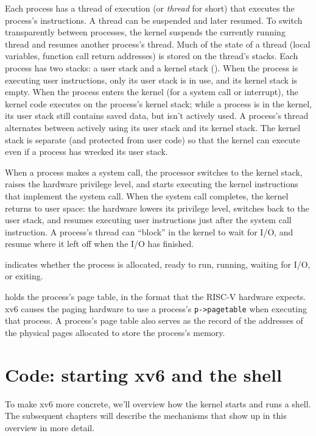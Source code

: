 Each process has a thread of execution (or 
\textit{thread}
for short) that executes the process's instructions.
A thread can be suspended and later resumed.
To switch transparently between processes,
the kernel suspends the currently running thread and resumes another process's
thread.  Much of the state of a thread (local variables, function call return
addresses) is stored on the thread's stacks.
Each process has two stacks: a user stack and a kernel stack
().
When the process is executing user instructions, only its user stack
is in use, and its kernel stack is empty.
When the process enters the kernel (for a system call or interrupt),
the kernel code executes on the process's kernel stack; while
a process is in the kernel, its user stack still contains saved
data, but isn't actively used.
A process's thread alternates between actively using its user stack
and its kernel stack. The kernel stack is separate (and protected from
user code) so that the kernel
can execute even if a process has wrecked its user stack.

When a process makes a system call, the processor switches to the 
kernel stack, raises the hardware privilege level, and starts
executing the kernel instructions that implement the system call.
When the system call completes, the kernel returns to user space:
the hardware lowers its privilege level, switches back to the
user stack, and resumes executing user instructions just after
the system call instruction.
A process's thread
can ``block'' in the kernel to wait for I/O, and resume where it left
off when the I/O has finished.

indicates whether the process is allocated, ready
to run, running, waiting for I/O, or exiting.

holds the process's page table, in the format
that the RISC-V hardware expects.
xv6 causes the paging hardware to use a process's
\lstinline{p->pagetable}
when executing that process.
A process's page table also serves as the record of the
addresses of the physical pages allocated to store the process's memory.
\section{Code: starting xv6 and the shell}
To make xv6 more concrete, we'll overview how the kernel starts and
runs a shell. The subsequent chapters will describe the mechanisms
that show up in this overview in more detail.

